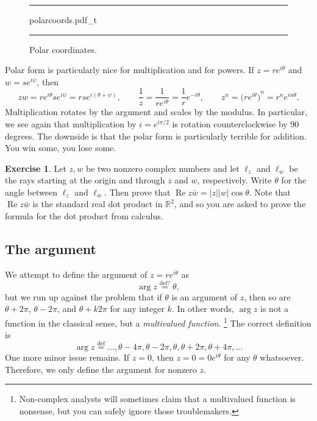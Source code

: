 \documentclass[12pt,openany]{book}
\newcommand{\glsadd}[2][]{}
\renewcommand{\Re}{\operatorname{Re}}
\newcommand{\sabs}[1]{\lvert {#1} \rvert}
\newcommand{\R}{{\mathbb{R}}}
\newcommand{\myindex}[1]{#1\index{#1}}
\theoremstyle{plain}
\theoremstyle{remark}
\theoremstyle{definition}
\newenvironment{exbox}{%
    \def\FrameCommand{\vrule width 1pt \relax\hspace{10pt}}%
    \MakeFramed{\advance\hsize-\width\FrameRestore}%
}{%
    \endMakeFramed
}
\newenvironment{myfig}{%
\begin{figure}[h!t]
\noindent\rule{\textwidth}{0.5pt}\vspace{12pt}\par\centering}%
{\par\noindent\rule{\textwidth}{0.5pt}
\end{figure}}
\theoremstyle{exercise}
\newtheorem{exercise}{Exercise}[section]
\theoremstyle{example}
\begin{document}
\begin{myfig}
{polarcoords.pdf_t}
\caption{Polar coordinates.\label{fig:polarcoords}}
\end{myfig}

Polar form is particularly nice for multiplication and for powers.
If $z = r e^{i\theta}$ and $w = s e^{i \psi}$, then
\begin{equation*}
zw =
r e^{i \theta} s e^{i \psi} = 
rs e^{i (\theta+ \psi)},
\qquad
\frac{1}{z} =
\frac{1}{r e^{i \theta}} =
\frac{1}{r} e^{-i \theta} ,
\qquad
z^n =
{\bigl(r e^{i \theta}\bigr)}^n =
r^n e^{i n\theta} .
\end{equation*}
Multiplication rotates by the argument and scales by the modulus.
In particular, we see again that multiplication by $i = e^{i \pi / 2}$ is
rotation counterclockwise by $90$ degrees.
The downside is that the polar form is particularly terrible for addition.
You win some, you lose some.

\begin{exbox}
\begin{exercise}
Let $z,w$ be two nonzero complex numbers and let
$\ell_z$ and $\ell_w$ be the rays starting at the origin and
through
$z$ and $w$, respectively.  Write $\theta$ for the angle between $\ell_z$ and
$\ell_w$.  Then prove that
$\Re z\bar{w} = \sabs{z} \sabs{w} \cos \theta$.
Note that $\Re z\bar{w}$ is the standard real dot product in $\R^2$, and so
you are asked to prove the formula for the dot product from calculus.
\end{exercise}
\end{exbox}

\subsection{The argument}

We attempt to define the argument of $z = re^{i\theta}$ as
\glsadd{not:arg}%
\begin{equation*}
\arg z
\overset{\text{def?}}{=}
\theta ,
\end{equation*}
but we run up against the problem that if $\theta$ is an argument of $z$,
then so are $\theta+2\pi$, $\theta-2\pi$, and $\theta + k 2\pi$ for any
integer $k$.  In other words,
$\arg z$ is not a function in the classical sense, but a
\emph{\myindex{multivalued function}}.%
\footnote{Non-complex analysts will sometimes claim that a multivalued
function is nonsense, but you can safely ignore those troublemakers.}
The correct definition is
\glsadd{not:arg}%
\begin{equation*}
\arg z
\overset{\text{def}}{=}
\ldots,\theta - 4\pi,
\theta - 2\pi,
\theta ,
\theta + 2\pi,
\theta + 4\pi, \ldots
\end{equation*}
One more minor issue remains.  If $z=0$, then $z=0=0 e^{i\theta}$ for any
$\theta$ whatsoever.  Therefore, we only define the argument for nonzero
$z$.
\end{document}

